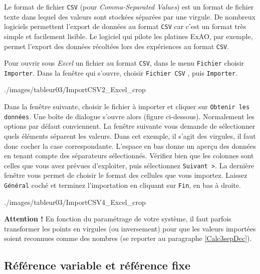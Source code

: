 Le format de fichier \texttt{CSV} (pour \emph{Comma-Separated Values}) est un format de fichier texte dans lequel des valeurs sont stockées séparées par une virgule. De nombreux logiciels permettent l'export de données au format \texttt{CSV} car c'est un format très simple et facilement lisible. Le logiciel qui pilote les platines ExAO, par exemple, permet l'export des données récoltées lors des expériences au format \texttt{CSV}.

\vspace{1em}

Pour ouvrir sous \emph{Excel} un fichier au format \texttt{CSV}, dans le menu \texttt{Fichier}  choisir \texttt{Importer}.  Dans la fenêtre qui s'ouvre, choisir \texttt{Fichier CSV} , puis \texttt{Importer}. 

%
{./images/tableur03/ImportCSV2_Excel_crop}{\textwidth}

Dans la fenêtre suivante, choisir le fichier à importer et cliquer sur \texttt{Obtenir les données}. Une boîte de dialogue s'ouvre alors (figure ci-dessous). Normalement les options par défaut conviennent. La fenêtre suivante vous demande de sélectionner quels éléments séparent les valeurs.  Dans cet exemple, il s'agit des virgules, il faut donc cocher la case correspondante. L'espace en bas donne un aperçu des données en tenant compte des séparateurs sélectionnés.  Vérifiez bien que les colonnes sont celles que vous avez prévues d'exploiter, puis sélectionnez \texttt{Suivant >}. La dernière fenêtre vous permet de choisir le format des cellules que vous importez. Laissez \texttt{Général} coché et terminez l'importation en cliquant sur \texttt{Fin}, en bas à droite.

%
{./images/tableur03/ImportCSV4_Excel_crop}{\textwidth}

\textbf{Attention !} En fonction du paramétrage de votre système, il faut parfois transformer les points en virgules (ou inversement) pour que les valeurs importées soient reconnues comme des nombres (se reporter au paragraphe \vref{Calc3sepDec}).



\subsection{Référence variable et référence fixe}\label{Calc3reference} 

